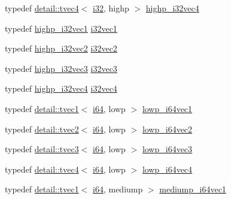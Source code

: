 \begin{DoxyCompactItemize}
\item 
typedef \hyperlink{structglm_1_1detail_1_1tvec4}{detail\+::tvec4}$<$ \hyperlink{group__gtc__type__precision_ga1d8ed5c43e91ea7d4528389da4fa9524}{i32}, highp $>$ \hyperlink{group__gtc__type__precision_ga174af0fafdc5a9eb24150792bffa8b5c}{highp\+\_\+i32vec4}
\item 
typedef \hyperlink{group__gtc__type__precision_gadcd58130a48fa561e784a135a88c5d6e}{highp\+\_\+i32vec1} \hyperlink{group__gtc__type__precision_ga0d3741d44591183f3dee9500b4ad9ab4}{i32vec1}
\item 
typedef \hyperlink{group__gtc__type__precision_ga6020d795076243085eb0d6826c849b4a}{highp\+\_\+i32vec2} \hyperlink{group__gtc__type__precision_gabb9ac4a278f8a8e3a3928dc9bef81089}{i32vec2}
\item 
typedef \hyperlink{group__gtc__type__precision_ga95de80f73e676fb6b9976ff0d33bbc4b}{highp\+\_\+i32vec3} \hyperlink{group__gtc__type__precision_ga79a21b299190b6fee673087376753db0}{i32vec3}
\item 
typedef \hyperlink{group__gtc__type__precision_ga174af0fafdc5a9eb24150792bffa8b5c}{highp\+\_\+i32vec4} \hyperlink{group__gtc__type__precision_ga5fea6ade2c848bca1fa55636e75a10b9}{i32vec4}
\item 
typedef \hyperlink{structglm_1_1detail_1_1tvec1}{detail\+::tvec1}$<$ \hyperlink{group__gtc__type__precision_gac7a7eaad46064fc952b06df33689da23}{i64}, lowp $>$ \hyperlink{group__gtc__type__precision_gaf427ced1906a1788fdd9faab2e57c60a}{lowp\+\_\+i64vec1}
\item 
typedef \hyperlink{structglm_1_1detail_1_1tvec2}{detail\+::tvec2}$<$ \hyperlink{group__gtc__type__precision_gac7a7eaad46064fc952b06df33689da23}{i64}, lowp $>$ \hyperlink{group__gtc__type__precision_gad88a04aaa07fabf57fdbad8e6b7bcc9c}{lowp\+\_\+i64vec2}
\item 
typedef \hyperlink{structglm_1_1detail_1_1tvec3}{detail\+::tvec3}$<$ \hyperlink{group__gtc__type__precision_gac7a7eaad46064fc952b06df33689da23}{i64}, lowp $>$ \hyperlink{group__gtc__type__precision_gaa42f666ccdb6d1ef6326882b4f377678}{lowp\+\_\+i64vec3}
\item 
typedef \hyperlink{structglm_1_1detail_1_1tvec4}{detail\+::tvec4}$<$ \hyperlink{group__gtc__type__precision_gac7a7eaad46064fc952b06df33689da23}{i64}, lowp $>$ \hyperlink{group__gtc__type__precision_ga95c13b9d4f94d1783e7d96534d1651d8}{lowp\+\_\+i64vec4}
\item 
typedef \hyperlink{structglm_1_1detail_1_1tvec1}{detail\+::tvec1}$<$ \hyperlink{group__gtc__type__precision_gac7a7eaad46064fc952b06df33689da23}{i64}, mediump $>$ \hyperlink{group__gtc__type__precision_gad2423a91c791b9ca2f8a3ecfc71b080d}{mediump\+\_\+i64vec1}

\end{DoxyCompactItemize}
